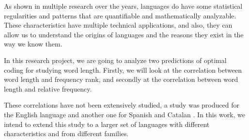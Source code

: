 As shown in multiple research over the years, languages do have some statistical regularities and patterns that are quantifiable and mathematically analyzable. These characteristics have multiple technical applications, and also, they can allow us to understand the origins of languages and the reasons they exist in the way we know them.

In this research project, we are going to analyze two predictions of optimal coding for studying word length. Firstly, we will look at the correlation between word length and frequency rank, and secondly at the correlation between word length and relative frequency.

These correlations have not been extensively studied, a study was produced for the English language \cite{torre2019physical} and another one for Spanish and Catalan \cite{hernandez2019linguistic}. In this work, we intend to extend this study to a larger set of languages with different characteristics and from different families.